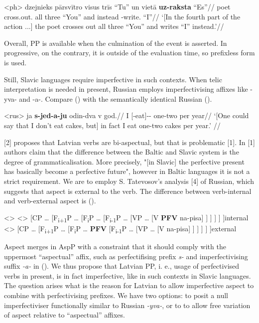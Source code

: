\documentclass[a4paper, 12pt]{article}
\begin{document}
\begin{sloppypar}
    \a<ph> \begingl 
        \gla dzejnieks pārsvītro visus trīs “Tu” un vietā \textbf{uz-raksta} “Es”//
        \glb poet cross.out.\Prs{} all three “You” and instead \Pfv-write.\Prs{} “I”//
        \glft ‘[In the fourth part of the action ...] the poet crosses out all three “You” and writes “I” instead.’\trailingcitation{[3]}//
    \endgl
\xe

Overall, PP is available when the culmination of the event is asserted. In progressive, on the contrary, it is outside of the evaluation time, so prefixless form is used.

Still, Slavic languages require imperfective in such contexts. When telic interpretation is needed
in present, Russian employs imperfectivising affixes like -yva- and -a-. Compare () with the semantically identical Russian (\nextx).

\ex<rus>
    \begingl
         ja \textbf{s-jed-a-ju} odin-dva v god.//
         I [\Pfv-eat]-\Ipfv-\Prs{} one-two per year//
        \glft ‘[One could say that I don’t eat cakes, but] in fact I eat one-two cakes per year.’ //
    \endgl
\xe

[2] proposes that Latvian verbs are bi-aspectual, but that is problematic [1]. In [1] authors
claim that the difference between the Baltic and Slavic system is the degree of
grammaticalisation. More precisely, "[in Slavic] the perfective present has basically become a
perfective future", however in Baltic languages it is not a strict requirement.
We are to employ S. Tatevosov’s analysis [4] of Russian, which suggests that aspect is
external to the verb. The difference between verb-internal and verb-external aspect is (\nextx).

\pex<>
    \a<> [CP … [F\textsubscript{i+1}P … [F\textsubscript{i}P … [F\textsubscript{i-1}P … [VP … [V \textbf{PFV} na-pisa] ] ] ] ] ]\hfill internal
    \a<> [CP … [F\textsubscript{i+1}P … [F\textsubscript{i}P … \textbf{PFV} [F\textsubscript{i-1}P … [VP … [V na-pisa] ] ] ] ] ]\hfill external
\xe

Aspect merges in AspP with a constraint that it should comply with the uppermost “aspectual”
affix, such as perfectifising prefix \textit{s-} and imperfectivising suffix \textit{-a-} in ().
We thus propose that Latvian PP, i. e., usage of perfectivised verbs in present, is in fact
imperfective, like in such contexts in Slavic languages. The question arises what is the reason
for Latvian to allow imperfective aspect to combine with perfectivising prefixes. We have two
options: to posit a null imperfectiviser functionally similar to Russian \textit{-yva-}, or to to allow free
variation of aspect relative to “aspectual” affixes.


\end{sloppypar}
\end{document}

